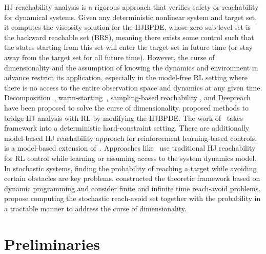 \documentclass{article}
\theoremstyle{definition}
\begin{document}
HJ reachability analysis is a rigorous approach that verifies safety or reachability for dynamical systems. Given any deterministic nonlinear system and target set, it computes the viscosity solution for the HJBPDE, whose zero sub-level set is the backward reachable set (BRS), meaning there exists some control such that the states starting from this set will enter the target set in future time (or stay away from the target set for all future time). However, the curse of dimensionality and the assumption of knowing the dynamics and environment in advance restrict its application, especially in the model-free RL setting where there is no access to the entire observation space and dynamics at any given time. Decomposition~\cite{decomposition}, warm-starting~\cite{herbert2019reachability}, sampling-based reachability \cite{LewJansonEtAl2022}, and Deepreach~\cite{bansal2021deepreach} have been proposed to solve the curse of dimensionality. \cite{akametalu2018minimum, fisac2019bridging} proposed methods to bridge HJ analysis with RL by modifying the HJBPDE. The work of~\cite{yu2022reachability} takes framework into a deterministic hard-constraint setting. There are additionally model-based HJ reachability approach for reinforcement learning-based controls. \cite{yu2022safe} is a model-based extension of~\cite{yu2022reachability}. Approaches like~\cite{kochdumper2023provably, gu2022constrained, selim2022safe} use traditional HJ reachability for RL control while learning or assuming access to the system dynamics model. In stochastic systems, finding the probability of reaching a target while avoiding certain obstacles are key problems. \cite{abate2008probabilistic, summers2010verification} constructed the theoretic framework based on dynamic programming and consider finite and infinite time reach-avoid problems. \cite{kariotoglou2016computational, vinod2021stochastic, chapman2021risk} propose computing the stochastic reach-avoid set together with the probability in a tractable manner to address the curse of dimensionality.

\vspace{-5pt}
\section{Preliminaries}
\end{document}
